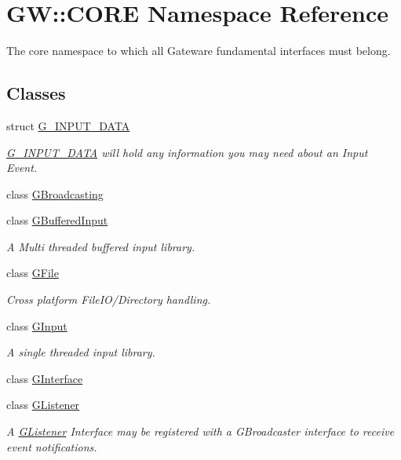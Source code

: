 \hypertarget{namespace_g_w_1_1_c_o_r_e}{}\section{GW\+:\+:C\+O\+RE Namespace Reference}
\label{namespace_g_w_1_1_c_o_r_e}


The core namespace to which all Gateware fundamental interfaces must belong.  


\subsection*{Classes}
\begin{DoxyCompactItemize}
\item 
struct \hyperlink{struct_g_w_1_1_c_o_r_e_1_1_g___i_n_p_u_t___d_a_t_a}{G\+\_\+\+I\+N\+P\+U\+T\+\_\+\+D\+A\+TA}
\begin{DoxyCompactList}\small\item\em \hyperlink{struct_g_w_1_1_c_o_r_e_1_1_g___i_n_p_u_t___d_a_t_a}{G\+\_\+\+I\+N\+P\+U\+T\+\_\+\+D\+A\+TA} will hold any information you may need about an Input Event. \end{DoxyCompactList}\item 
class \hyperlink{class_g_w_1_1_c_o_r_e_1_1_g_broadcasting}{G\+Broadcasting}
\item 
class \hyperlink{class_g_w_1_1_c_o_r_e_1_1_g_buffered_input}{G\+Buffered\+Input}
\begin{DoxyCompactList}\small\item\em A Multi threaded buffered input library. \end{DoxyCompactList}\item 
class \hyperlink{class_g_w_1_1_c_o_r_e_1_1_g_file}{G\+File}
\begin{DoxyCompactList}\small\item\em Cross platform File\+I\+O/\+Directory handling. \end{DoxyCompactList}\item 
class \hyperlink{class_g_w_1_1_c_o_r_e_1_1_g_input}{G\+Input}
\begin{DoxyCompactList}\small\item\em A single threaded input library. \end{DoxyCompactList}\item 
class \hyperlink{class_g_w_1_1_c_o_r_e_1_1_g_interface}{G\+Interface}
\item 
class \hyperlink{class_g_w_1_1_c_o_r_e_1_1_g_listener}{G\+Listener}
\begin{DoxyCompactList}\small\item\em A \hyperlink{class_g_w_1_1_c_o_r_e_1_1_g_listener}{G\+Listener} Interface may be registered with a G\+Broadcaster interface to receive event notifications. \end{DoxyCompactList}\item 

\end{DoxyCompactItemize}

